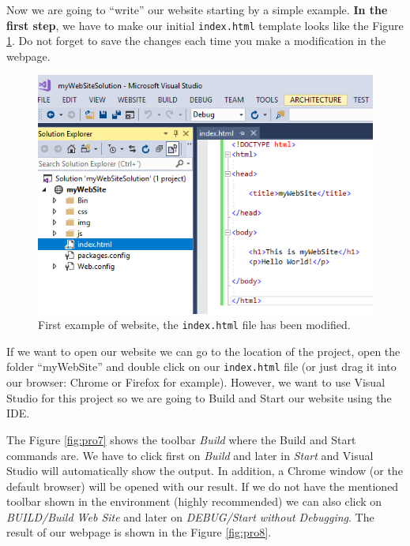 Now we are going to ``write'' our website starting by a simple example. \textbf{In the first step}, we have to make our initial \texttt{index.html} template looks like the Figure \ref{fig:pro6}. Do not forget to save the changes each time you make a modification in the webpage. 

\begin{figure}
    \centering
    \includegraphics[width= 0.9 \textwidth]{Figures/Projects/pro6}
    \caption{First example of website, the \texttt{index.html} file has been modified.}
    \label{fig:pro6}
\end{figure}

If we want to open our website we can go to the location of the project, open the folder ``myWebSite'' and double click on our \texttt{index.html} file (or just drag it into our browser: Chrome or Firefox for example). However, we want to use Visual Studio for this project so we are going to Build and Start our website using the IDE. 

The Figure \ref{fig:pro7} shows the toolbar \textit{Build} where the Build and Start commands are. We have to click first on \textit{Build} and later in \textit{Start} and Visual Studio will automatically show the output. In addition, a Chrome window (or the default browser) will be opened with our result. If we do not have the mentioned toolbar shown in the environment (highly recommended) we can also click on \textit{BUILD/Build Web Site} and later on \textit{DEBUG/Start without Debugging}. The result of our webpage is shown in the Figure \ref{fig:pro8}.

